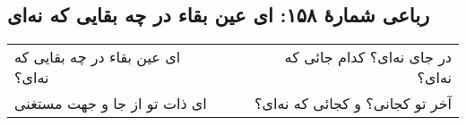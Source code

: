 \begin{center}
\section*{رباعی شمارهٔ ۱۵۸: ای عین بقاء در چه بقایی که نه‌ای}
\label{sec:158}
\begin{longtable}{l p{0.5cm} r}
ای عین بقاء در چه بقایی که نه‌ای؟
&&
در جای نه‌ای؟ کدام جائی که نه‌ای؟
\\
ای ذات تو از جا و جهت مستغنی
&&
آخر تو کجانی؟ و کجائی که نه‌ای؟
\\
\end{longtable}
\end{center}
